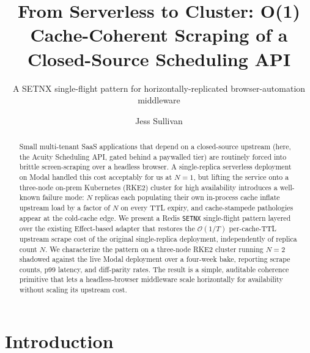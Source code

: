 \documentclass[sigconf,nonacm,screen]{acmart}
\title{From Serverless to Cluster: O(1) Cache-Coherent Scraping of a
       Closed-Source Scheduling API}
\subtitle{A SETNX single-flight pattern for horizontally-replicated
          browser-automation middleware}
\author{Jess Sullivan}
\affiliation{%
  \institution{Tinyland}
  \city{Ithaca}
  \state{NY}
  \country{USA}
}
\begin{document}
\begin{abstract}
Small multi-tenant SaaS applications that depend on a closed-source
upstream (here, the Acuity Scheduling API, gated behind a paywalled
tier) are routinely forced into brittle screen-scraping over a
headless browser. A single-replica serverless deployment on Modal
handled this cost acceptably for us at $N=1$, but lifting the service
onto a three-node on-prem Kubernetes (RKE2) cluster for high
availability introduces a well-known failure mode: $N$ replicas each
populating their own in-process cache inflate upstream load by a
factor of $N$ on every TTL expiry, and cache-stampede pathologies
appear at the cold-cache edge.
We present a Redis \texttt{SETNX} single-flight pattern layered over
the existing Effect-based adapter that restores the $\mathcal{O}(1/T)$
per-cache-TTL upstream scrape cost of the original single-replica
deployment, independently of replica count $N$. We characterize the
pattern on a three-node RKE2 cluster running $N{=}2$ shadowed against
the live Modal deployment over a four-week bake, reporting scrape
counts, p99 latency, and diff-parity rates.
The result is a simple, auditable coherence primitive that lets a
headless-browser middleware scale horizontally for availability
without scaling its upstream cost.
\end{abstract}

\maketitle

\section{Introduction}
\label{sec:intro}

\end{document}

